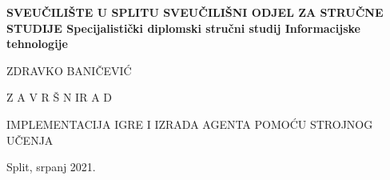 %
%
\begin{titlepage}
	\bfseries
	\headerdata
	{SVEUČILIŠTE U SPLITU}
	{SVEUČILIŠNI ODJEL ZA STRUČNE STUDIJE}
	{Specijalistički diplomski stručni studij Informacijske tehnologije}
	
	\vspace*{6cm}
	\begin{center}
		{\Large ZDRAVKO BANIČEVIĆ}
		
		\vspace*{1cm}
		
		{\LARGE {Z A V R Š N I\space\space\space R A D}}
		
		\vspace*{1cm}
		\Large IMPLEMENTACIJA IGRE I IZRADA AGENTA POMOĆU STROJNOG UČENJA\\[1cm]
	
	\end{center}
	\begin{center}
		\vfill
		{\large\normalfont Split, srpanj 2021.}
	\end{center}
\end{titlepage}
%
%